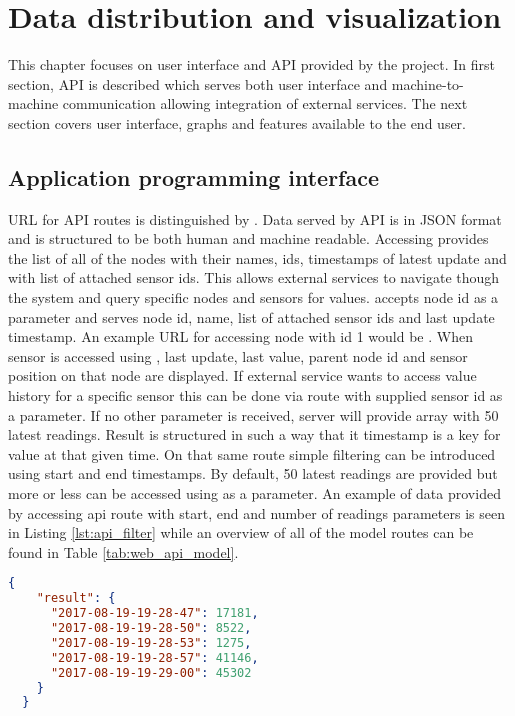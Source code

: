 \chapter{Data distribution and visualization}
\label{chap:display}

This chapter focuses on user interface and \ac{API} provided by the project. In first section, \ac{API} is described which serves both user interface and machine-to-machine communication allowing integration of external services. The next section covers user interface, graphs and features available to the end user.


\section{Application programming interface}

\ac{URL} for \ac{API} routes is distinguished by . Data served by \ac{API} is in \ac{JSON} format and is structured to be both human and machine readable. Accessing  provides the list of all of the nodes with their names, \ac{id}s, timestamps of latest update and with list of attached sensor \ac{id}s. This allows external services to navigate though the system and query specific nodes and sensors for values.  accepts node \ac{id} as a parameter and serves node id, name, list of attached sensor ids and last update timestamp. An example \ac{URL} for accessing node with id 1 would be . When sensor is accessed using , last update, last value, parent node id and sensor position on that node are displayed. If external service wants to access value history for a specific sensor this can be done via route  with supplied sensor id as a parameter. If no other parameter is received, server will provide array with 50 latest readings. Result is structured in such a way that it timestamp is a key for value at that given time. On that same route simple filtering can be introduced using start and end timestamps. By default, 50 latest readings are provided but more or less can be accessed using  as a parameter. An example of data provided by accessing api route with start, end and number of readings parameters is seen in Listing \ref{lst:api_filter} while an overview of all of the model routes can be found in Table \ref{tab:web_api_model}.\\

\begin{lstlisting}[language=json,firstnumber=1,caption={API result for first 5 readings done in a set period of time},label={lst:api_filter}]
  {
    "result": {
      "2017-08-19-19-28-47": 17181, 
      "2017-08-19-19-28-50": 8522, 
      "2017-08-19-19-28-53": 1275, 
      "2017-08-19-19-28-57": 41146, 
      "2017-08-19-19-29-00": 45302
    }
  }
\end{lstlisting}

